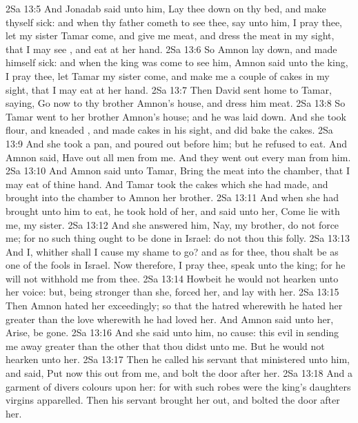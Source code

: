 \vs 2Sa 13:5 And Jonadab said unto him, Lay thee down on thy bed, and make thyself sick: and when thy father cometh to see thee, say unto him, I pray thee, let my sister Tamar come, and give me meat, and dress the meat in my sight, that I may see , and eat  at her hand.
\vs 2Sa 13:6 So Amnon lay down, and made himself sick: and when the king was come to see him, Amnon said unto the king, I pray thee, let Tamar my sister come, and make me a couple of cakes in my sight, that I may eat at her hand.
\vs 2Sa 13:7 Then David sent home to Tamar, saying, Go now to thy brother Amnon's house, and dress him meat.
\vs 2Sa 13:8 So Tamar went to her brother Amnon's house; and he was laid down. And she took flour, and kneaded , and made cakes in his sight, and did bake the cakes.
\vs 2Sa 13:9 And she took a pan, and poured  out before him; but he refused to eat. And Amnon said, Have out all men from me. And they went out every man from him.
\vs 2Sa 13:10 And Amnon said unto Tamar, Bring the meat into the chamber, that I may eat of thine hand. And Tamar took the cakes which she had made, and brought  into the chamber to Amnon her brother.
\vs 2Sa 13:11 And when she had brought  unto him to eat, he took hold of her, and said unto her, Come lie with me, my sister.
\vs 2Sa 13:12 And she answered him, Nay, my brother, do not force me; for no such thing ought to be done in Israel: do not thou this folly.
\vs 2Sa 13:13 And I, whither shall I cause my shame to go? and as for thee, thou shalt be as one of the fools in Israel. Now therefore, I pray thee, speak unto the king; for he will not withhold me from thee.
\vs 2Sa 13:14 Howbeit he would not hearken unto her voice: but, being stronger than she, forced her, and lay with her.
\vs 2Sa 13:15 Then Amnon hated her exceedingly; so that the hatred wherewith he hated her  greater than the love wherewith he had loved her. And Amnon said unto her, Arise, be gone.
\vs 2Sa 13:16 And she said unto him,  no cause: this evil in sending me away  greater than the other that thou didst unto me. But he would not hearken unto her.
\vs 2Sa 13:17 Then he called his servant that ministered unto him, and said, Put now this  out from me, and bolt the door after her.
\vs 2Sa 13:18 And  a garment of divers colours upon her: for with such robes were the king's daughters  virgins apparelled. Then his servant brought her out, and bolted the door after her.
